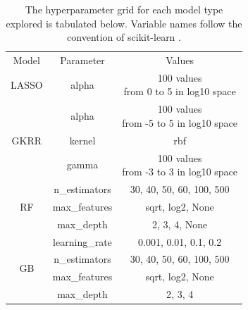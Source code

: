 \documentclass[11pt,a4paper]{article}
\begin{document}
\begin{table}[H]
\centering
\caption{The hyperparameter grid for each model type explored is tabulated below. Variable names follow the convention of scikit-learn \cite{scikit-learn}.}
\begin{tabular}{|c|c|c|}
\hline
{Model}                 & {Parameter}   & {Values}        \\ \Xhline{3\arrayrulewidth}
LASSO                 & alpha                      & \makecell{100 values \\ from 0 to 5 in log10 space}  \\ \hline
\multirow{3}{*}{GKRR} & alpha                      & \makecell{100 values \\ from -5 to 5 in log10 space} \\ \cline{2-3} 
                               & kernel                     & rbf                                    \\ \cline{2-3} 
                               & gamma                      & \makecell{100 values \\ from -3 to 3 in log10 space} \\ \hline
\multirow{3}{*}{RF}   & n\_estimators       & 30, 40, 50, 60, 100, 500               \\ \cline{2-3} 
                               & max\_features & sqrt, log2, None                       \\ \cline{2-3} 
                               & max\_depth              & 2, 3, 4, None                          \\ \hline
\multirow{4}{*}{GB}   & learning\_rate              & 0.001, 0.01, 0.1, 0.2                  \\ \cline{2-3} 
                               & n\_estimators       & 30, 40, 50, 60, 100, 500               \\ \cline{2-3} 
                               & max\_features & sqrt, log2, None                       \\ \cline{2-3} 
                               & max\_depth              & 2, 3, 4                                \\ \hline
\end{tabular}
\label{gridsearch}
\end{table}
\end{document}
